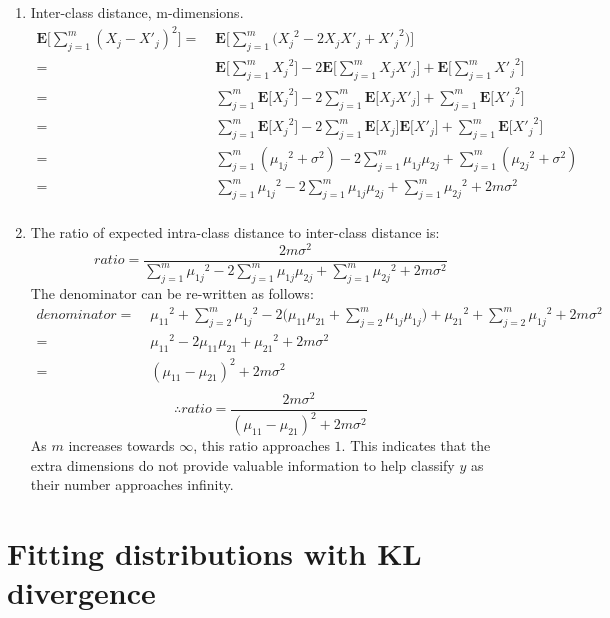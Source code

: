 \documentclass[english]{article}
\newcommand{\E}{\mathbf{E}}
\begin{document}
\begin{enumerate}
\item Inter-class distance, m-dimensions.
  \begin{align*}
    \E\bigg[\sum_{j=1}^m (X_{j} - X'_{j})^2\bigg] =&\; \E\bigg[\sum_{j=1}^m\big({X_{j}}^2 - 2X_{j}X'_{j} + {X'_{j}}^2\big)\bigg] \\
    =&\; \E\bigg[\sum_{j=1}^m {X_{j}}^2\bigg] - 2\E\bigg[\sum_{j=1}^m X_{j}X'_{j}\bigg] + \E\bigg[\sum_{j=1}^m {X'_{j}}^2\bigg] \\
    =&\; \sum_{j=1}^m\E\big[ {X_{j}}^2\big] - 2\sum_{j=1}^m\E\big[ X_{j}X'_{j}\big] + \sum_{j=1}^m\E\big[ {X'_{j}}^2\big] \\
    =&\; \sum_{j=1}^m\E\big[ {X_{j}}^2\big] - 2\sum_{j=1}^m\E\big[ X_{j}\big]\E\big[X'_{j}\big] + \sum_{j=1}^m\E\big[ {X'_{j}}^2\big] \\
    =&\; \sum_{j=1}^m({\mu_{1j}}^2 + \sigma^2) - 2\sum_{j=1}^m {\mu_{1j}}{\mu_{2j}} + \sum_{j=1}^m({\mu_{2j}}^2 + \sigma^2) \\
    =&\; \sum_{j=1}^m {\mu_{1j}}^2 - 2 \sum_{j=1}^m {\mu_{1j}}{\mu_{2j}} + \sum_{j=1}^m {\mu_{2j}}^2 + 2m\sigma^2 \\
  \end{align*}

\item The ratio of expected intra-class distance to inter-class
  distance is: 
  $$ratio = \frac{2m\sigma^2}{\sum_{j=1}^m {\mu_{1j}}^2 - 2 \sum_{j=1}^m {\mu_{1j}}{\mu_{2j}} + \sum_{j=1}^m {\mu_{2j}}^2 + 2m\sigma^2}$$  
  The denominator can be re-written as follows:
  \begin{align*}
    denominator =&\; {\mu_{11}}^2 + \sum_{j=2}^m {\mu_{1j}}^2 - 2 \bigg({\mu_{11}}{\mu_{21}} + \sum_{j=2}^m {\mu_{1j}}{\mu_{1j}}\bigg) + {\mu_{21}}^2 + \sum_{j=2}^m {\mu_{1j}}^2 + 2m\sigma^2 \\
    =&\; {\mu_{11}}^2 - 2{\mu_{11}}{\mu_{21}} + {\mu_{21}}^2  + 2m\sigma^2 \\
     =&\; ({\mu_{11}} - {\mu_{21}})^2 + 2m\sigma^2 \\
  \end{align*}
   $$\therefore ratio = \frac{2m\sigma^2}{({\mu_{11}} - {\mu_{21}})^2 + 2m\sigma^2}$$  
  As $m$ increases towards $\infty$, this
  ratio approaches $1$. This indicates that the extra dimensions do not provide valuable information to help classify $y$ as their number approaches infinity.
\end{enumerate}

\section{Fitting distributions with KL divergence}
\end{document}
